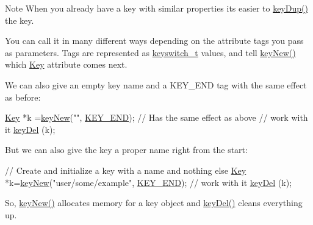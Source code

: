 \begin{DoxyNote}{Note}
When you already have a key with similar properties its easier to \hyperlink{group__key_gae6ec6a60cc4b8c1463fa08623d056ce3}{key\+Dup()} the key.
\end{DoxyNote}
You can call it in many different ways depending on the attribute tags you pass as parameters. Tags are represented as \hyperlink{group__key_ga91fb3178848bd682000958089abbaf40}{keyswitch\+\_\+t} values, and tell \hyperlink{group__key_gad23c65b44bf48d773759e1f9a4d43b89}{key\+New()} which \hyperlink{classkdb_1_1Key}{Key} attribute comes next.

We can also give an empty key name and a K\+E\+Y\+\_\+\+E\+N\+D tag with the same effect as before\+:


\begin{DoxyCodeInclude}
\hyperlink{classkdb_1_1Key_a5679f5cae63caddd64a60388b9cc77fa}{Key} *k =\hyperlink{group__key_gad23c65b44bf48d773759e1f9a4d43b89}{keyNew}(\textcolor{stringliteral}{""}, \hyperlink{group__key_gga91fb3178848bd682000958089abbaf40aa8adb6fcb92dec58fb19410eacfdd403}{KEY\_END}); \textcolor{comment}{// Has the same effect as above}
\textcolor{comment}{// work with it}
\hyperlink{group__key_ga3df95bbc2494e3e6703ece5639be5bb1}{keyDel} (k);
\end{DoxyCodeInclude}
 But we can also give the key a proper name right from the start\+:


\begin{DoxyCodeInclude}
\textcolor{comment}{// Create and initialize a key with a name and nothing else}
\hyperlink{classkdb_1_1Key_a5679f5cae63caddd64a60388b9cc77fa}{Key} *k=\hyperlink{group__key_gad23c65b44bf48d773759e1f9a4d43b89}{keyNew}(\textcolor{stringliteral}{"user/some/example"}, \hyperlink{group__key_gga91fb3178848bd682000958089abbaf40aa8adb6fcb92dec58fb19410eacfdd403}{KEY\_END});
\textcolor{comment}{// work with it}
\hyperlink{group__key_ga3df95bbc2494e3e6703ece5639be5bb1}{keyDel} (k);
\end{DoxyCodeInclude}
 So, \hyperlink{group__key_gad23c65b44bf48d773759e1f9a4d43b89}{key\+New()} allocates memory for a key object and \hyperlink{group__key_ga3df95bbc2494e3e6703ece5639be5bb1}{key\+Del()} cleans everything up.

